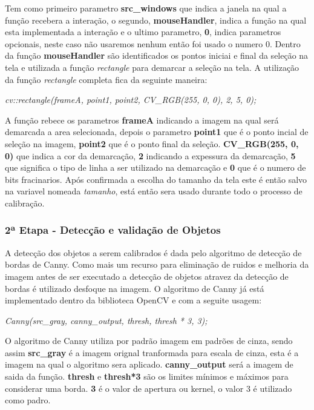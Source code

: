 Tem como primeiro parametro \textbf{src\_windows} que indica a janela na qual a função recebera a interação,  o segundo, \textbf{mouseHandler}, indica a função na qual esta implementada a interação e o ultimo parametro, \textbf{0}, indica parametros opcionais, neste caso não usaremos nenhum então foi usado o numero 0.
Dentro da função \textbf{mouseHandler} são identificados os pontos iniciai e final da seleção na tela e utilizada a função \textit{rectangle} para demarcar a seleção na tela. A utilização da função \textit{rectangle} completa fica da seguinte maneira:
\begin{center}
\centering \textit{ cv::rectangle(frameA, point1, point2, CV\_RGB(255, 0, 0), 2, 5, 0);}
\end{center}
A função rebece os parametros \textbf{frameA} indicando a imagem na qual será demarcada a area selecionada, depois o parametro \textbf{point1} que é o ponto incial de seleção na imagem, \textbf{point2} que é o ponto final da seleção. \textbf{CV\_RGB(255, 0, 0)} que indica a cor da demarcação, \textbf{2} indicando a expessura da demarcação, \textbf{5} que significa o tipo de linha a ser utilizado na demarcação e \textbf{0} que é o numero de bits fracinarios.
 Após confirmada a escolha do tamanho da tela 
este é então salvo na variavel nomeada \textit{tamanho}, está então sera usado durante todo o processo de calibração.
\newpage
\subsubsection{2ª Etapa - Detecção e validação de Objetos}
A detecção dos objetos a serem calibrados é dada pelo algoritmo de detecção de bordas de Canny. Como mais um recurso para eliminação de ruidos e melhoria da imagem antes de ser executado a detecção de objetos atravez da detecção de bordas é utilizado desfoque na imagem. O algoritmo de Canny já está implementado dentro da biblioteca OpenCV e com a seguite usagem:
\begin{center}
\centering \textit{  Canny(src\_gray, canny\_output, thresh, thresh * 3, 3);}
\end{center}
O algoritmo de Canny utiliza por padrão imagem em padrões de cinza, sendo assim \textbf{src\_gray} é a imagem orignal tranformada para escala de cinza, esta é a imagem na qual o algoritmo sera aplicado. \textbf{canny\_output} será a imagem de saida da função.
\textbf{thresh} e \textbf{thresh*3} são os limites mínimos e máximos para considerar uma borda. \textbf{3} é o valor de apertura ou kernel, o valor 3 é utilizado como padro.

